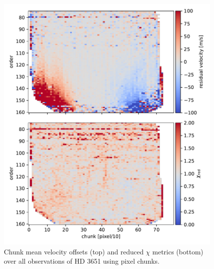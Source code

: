 \begin{figure}
    \centering
    \includegraphics{figures-5/pixel-chunk-resid.pdf}
    \caption[Forward model chunk velocity offsets and reduced $\chi$ metrics -- pixel chunks]{Chunk mean velocity offsets (top) and reduced $\chi$ metrics (bottom) over all observations of HD 3651 using pixel chunks.}
    \label{fig:pixel-chunk-resid}
\end{figure}

